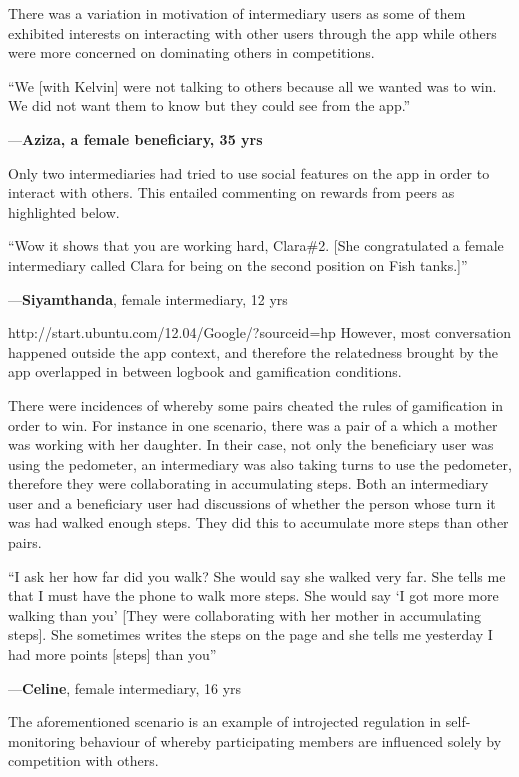 \documentclass{sig-alternate}
\newenvironment{myquote}
               {\list{}{\rightmargin   \leftmargin
                        \parsep        0in }%
                \item\relax}
               {\endlist}
\newcommand{\userquote}[2]{\begin{samepage}\begin{myquote} 
     \em{\small{#2\begin{flushright}---#1\end{flushright}}}
   \end{myquote}\end{samepage}}
\begin{document}
There was a variation in motivation of intermediary users as some of them exhibited interests on interacting with other users through the app while others were more concerned on dominating others in competitions.

\userquote{\textbf{Aziza, a female beneficiary, 35 yrs}} {``We [with Kelvin] were not talking to others because all we wanted was to win. We did not want them to know but they could see from the app.''}
 
Only two intermediaries had tried to use social features on the app in order to interact with others. This entailed commenting on rewards from peers as highlighted below.


\userquote{\textbf{Siyamthanda}, female intermediary, 12 yrs } {``Wow it shows that you are working hard, Clara\#2. [She congratulated a female intermediary called Clara for being on the second position on Fish tanks.]''} 
http://start.ubuntu.com/12.04/Google/?sourceid=hp
However, most conversation happened outside the app context, and therefore the relatedness brought by the app overlapped in between logbook and gamification conditions.

There were incidences of whereby some pairs cheated the rules of gamification in order to win. For instance in one scenario, there was a pair of a which a mother was working with her daughter. In their case, not only the beneficiary user was using the pedometer, an intermediary was also taking turns to use the pedometer, therefore they were collaborating in accumulating steps. Both an intermediary user and a beneficiary user had discussions of whether the person whose turn it was had walked enough steps. They did this to accumulate more steps than other pairs.

\userquote{\textbf{Celine}, female intermediary, 16 yrs} {``I ask her how far did you walk?  She would say she walked very far. She tells me that I must have the phone to walk more steps. She would say `I got more more walking than you' [They were collaborating with her mother in accumulating steps]. She sometimes writes the steps on the page and she tells me yesterday I had more points [steps] than you''}   

The aforementioned scenario is an example of introjected regulation in self-monitoring behaviour of whereby participating members are influenced solely by competition with others.
\end{document}
